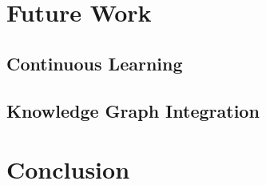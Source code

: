 \section{Future Work}

\subsection{Continuous Learning}

\subsection{Knowledge Graph Integration}

\section{Conclusion}
